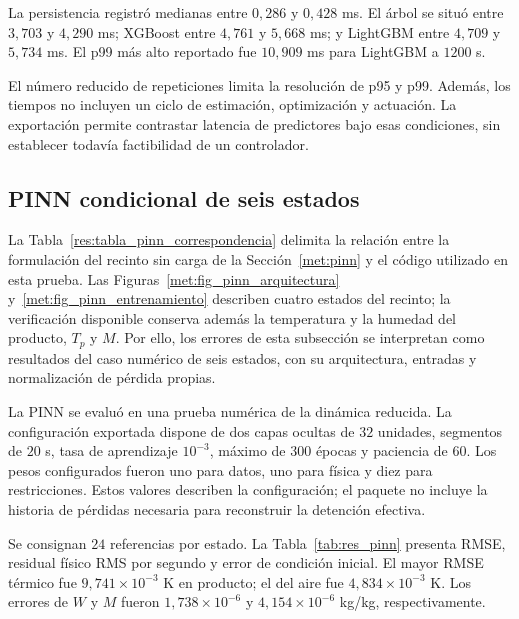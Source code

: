 La persistencia registró medianas entre $0{,}286$ y $0{,}428$ ms. El árbol se situó entre $3{,}703$ y $4{,}290$ ms; XGBoost entre $4{,}761$ y $5{,}668$ ms; y LightGBM entre $4{,}709$ y $5{,}734$ ms. El p99 más alto reportado fue $10{,}909$ ms para LightGBM a $1200$ s.

El número reducido de repeticiones limita la resolución de p95 y p99. Además, los tiempos no incluyen un ciclo de estimación, optimización y actuación. La exportación permite contrastar latencia de predictores bajo esas condiciones, sin establecer todavía factibilidad de un controlador.

\subsection{PINN condicional de seis estados}

La Tabla~\ref{res:tabla_pinn_correspondencia} delimita la relación entre la formulación del recinto sin carga de la Sección~\ref{met:pinn} y el código utilizado en esta prueba. Las Figuras~\ref{met:fig_pinn_arquitectura} y~\ref{met:fig_pinn_entrenamiento} describen cuatro estados del recinto; la verificación disponible conserva además la temperatura y la humedad del producto, $T_p$ y $M$. Por ello, los errores de esta subsección se interpretan como resultados del caso numérico de seis estados, con su arquitectura, entradas y normalización de pérdida propias.



La PINN se evaluó en una prueba numérica de la dinámica reducida. La configuración exportada dispone de dos capas ocultas de $32$ unidades, segmentos de $20$ s, tasa de aprendizaje $10^{-3}$, máximo de $300$ épocas y paciencia de $60$. Los pesos configurados fueron uno para datos, uno para física y diez para restricciones. Estos valores describen la configuración; el paquete no incluye la historia de pérdidas necesaria para reconstruir la detención efectiva.

Se consignan $24$ referencias por estado. La Tabla~\ref{tab:res_pinn} presenta RMSE, residual físico RMS por segundo y error de condición inicial. El mayor RMSE térmico fue $9{,}741\times10^{-3}$ K en producto; el del aire fue $4{,}834\times10^{-3}$ K. Los errores de $W$ y $M$ fueron $1{,}738\times10^{-6}$ y $4{,}154\times10^{-6}$ kg/kg, respectivamente.

